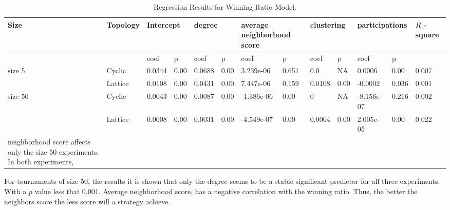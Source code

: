 \begin{table}[!hbtp]
\centering
\begin{adjustbox}{width=1\textwidth}
\small
\begin{tabular}{@{}|l|l|l|l|l|l|l|l|l|l|l|l|l|@{}}
\toprule
Size & Topology & \multicolumn{2}{l|}{Intercept} & \multicolumn{2}{l|}{degree} & \multicolumn{2}{l|}{average neighborhood score} & \multicolumn{2}{l|}{clustering} & \multicolumn{2}{l|}{participations} & \(R\) - square \\ \midrule
     &          & coef            & p            & coef          & p           & coef                      & p                    & coef             & p              & coef                & p             &          \\ \midrule
size 5  & Cyclic& 0.0344          & 0.00         & 0.0688        & 0.00        & 3.239e-06                 & 0.651                & 0.0              & NA             & 0.0006             & 0.00           & 0.007    \\ \midrule
     & Lattice  & 0.0108          & 0.00         & 0.0431        & 0.00        & 7.447e-06                 & 0.159                 & 0.0108           & 0.00           & -0.0002             & 0.036          & 0.001    \\ \midrule
size 50 & Cyclic& 0.0043          & 0.00         & 0.0087        & 0.00        & -1.386e-06                & 0.00                 & 0                & NA             & -8.156e-07          & 0.216          & 0.002    \\ \midrule
     & Lattice  & 0.0008          & 0.00         & 0.0031        & 0.00        & -4.549e-07                 & 0.00                 & 0.0004           & 0.00           & 2.005e-05          & 0.00          & 0.022    \\ \bottomrule
     neighborhood score affects only the size 50 experiments. In both experiments,
\end{tabular}
\end{adjustbox}
\caption{Regression Results for Winning Ratio Model.}
\label{regression-winning}
\end{table}


For tournaments of size 50, the results it is shown that only the degree seems
to be a stable significant predictor for all three experiments. With a \(p\)
value less that 0.001. Average neighborhood score, has a negative correlation
with the winning ratio. Thus, the
better the neighbors score the less score will a strategy achieve.


